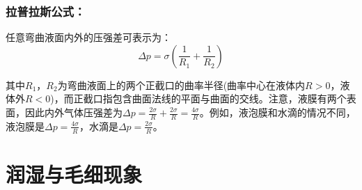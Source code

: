 \documentclass[zihao=5,UTF8]{report}
\begin{document}
\subsubsection{拉普拉斯公式：}
任意弯曲液面内外的压强差可表示为：
\begin{equation}
    \Delta p = \sigma(\frac{1}{R_1} + \frac{1}{R_2})
\end{equation}
{\par\color{gray}\small
其中$R_1$，$R_2$为弯曲液面上的两个正截口的曲率半径(曲率中心在液体内$R>0$，液体外$R<0$)，而正截口指包含曲面法线的平面与曲面的交线。注意，液膜有两个表面，因此内外气体压强差为{\color{red}$\Delta p =\frac{2\sigma}{R}+\frac{2\sigma}{R} = \frac{4\sigma}{R}$}。例如，液泡膜和水滴的情况不同，液泡膜是$\Delta p = \frac{4\sigma}{R}$，水滴是$\Delta p = \frac{2\sigma}{R}$。
\par}

\section{润湿与毛细现象}
\end{document}
